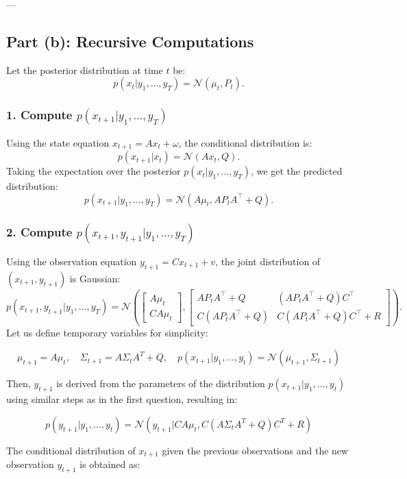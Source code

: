 \documentclass[12pt]{article}
\begin{document}
---

\subsection*{Part (b): Recursive Computations}

Let the posterior distribution at time \( t \) be:
\[
p(x_t | y_1, \dots, y_T) = \mathcal{N}(\mu_t, P_t).
\]

\subsubsection*{1. Compute $p(x_{t+1} | y_1, \dots, y_T)$}

Using the state equation \( x_{t+1} = A x_t + \omega \), the conditional distribution is:
\[
p(x_{t+1} | x_t) = \mathcal{N}(A x_t, Q).
\]
Taking the expectation over the posterior \( p(x_t | y_1, \dots, y_T) \), we get the predicted distribution:
\[
p(x_{t+1} | y_1, \dots, y_T) = \mathcal{N}(A \mu_t, A P_t A^\top + Q).
\]

\subsubsection*{2. Compute $p(x_{t+1}, y_{t+1} | y_1, \dots, y_T)$}

Using the observation equation \( y_{t+1} = C x_{t+1} + v \), the joint distribution of \( (x_{t+1}, y_{t+1}) \) is Gaussian:
\[
p(x_{t+1}, y_{t+1} | y_1, \dots, y_T) = \mathcal{N} \left(
\begin{bmatrix}
A \mu_t \\
C A \mu_t
\end{bmatrix},
\begin{bmatrix}
A P_t A^\top + Q & (A P_t A^\top + Q)C^\top \\
C (A P_t A^\top + Q) & C (A P_t A^\top + Q) C^\top + R
\end{bmatrix}
\right).
\]
Let us define temporary variables for simplicity:

\[
\mu_{t+1} = A\mu_t, \quad \Sigma_{t+1} = A\Sigma_t A^T + Q, \quad p(x_{t+1} | y_1, \ldots, y_t) = \mathcal{N}(\mu_{t+1}, \Sigma_{t+1})
\]

Then, \( y_{t+1} \) is derived from the parameters of the distribution \( p(x_{t+1} | y_1, \ldots, y_t) \) using similar steps as in the first question, resulting in:

\[
p(y_{t+1} | y_1, \ldots, y_t) = \mathcal{N}(y_{t+1} | C A \mu_t, C (A \Sigma_t A^T + Q) C^T + R)
\]

The conditional distribution of \( x_{t+1} \) given the previous observations and the new observation \( y_{t+1} \) is obtained as:
\end{document}
